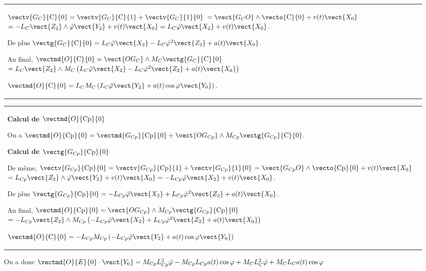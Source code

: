 \begin{multicols}{2}
\begin{corrige}
\begin{tabular}{|p{.9\linewidth}}
$\vectv{G_C}{\text{C}}{0}=\vectv{G_C}{\text{C}}{1}+\vectv{G_C}{\text{1}}{0}$ $=\vect{G_CO}\wedge \vecto{\text{C}}{0}+v(t)\vect{X_0}$ $=-L_C\vect{Z_2}\wedge \dot{\varphi}\vect{Y_2}+v(t)\vect{X_0}=L_C \dot{\varphi}\vect{X_2}+v(t)\vect{X_0}$.

De plus  $\vectg{G_C}{\text{C}}{0}=L_C \ddot{\varphi}\vect{X_2}-L_C \dot{\varphi}^2\vect{Z_2}+a(t)\vect{X_0}$.

Au final, $\vectmd{O}{\text{C}}{0} = \vect{OG_C} \wedge M_C\vectg{G_{C}}{\text{C}}{0}$
$ =L_C\vect{Z_2} \wedge M_C \left( L_C \ddot{\varphi}\vect{X_2}-L_C \dot{\varphi}^2\vect{Z_2}+a(t)\vect{X_0} \right)$

$\vectmd{O}{\text{C}}{0} =L_C M_C \left( L_C \ddot{\varphi}\vect{Y_2} +a(t) \cos \varphi \vect{Y_0} \right)$.

\end{tabular}

\vspace{.25cm}

 \begin{tabular}{|p{.9\linewidth}}
\textbf{Calcul de $\vectmd{O}{\text{Cp}}{0}$}

 On a $\vectmd{O}{\text{Cp}}{0} = \vectmd{G_{Cp}}{\text{Cp}}{0}+\vect{OG_{Cp}} \wedge M_{Cp}\vectg{G_{Cp}}{\text{C}}{0}$.

\textbf{Calcul de $\vectg{G_{Cp}}{\text{Cp}}{0}$}

De même, $\vectv{G_{Cp}}{\text{Cp}}{0}=\vectv{G_{Cp}}{\text{Cp}}{1}+\vectv{G_{Cp}}{\text{1}}{0}$ $=\vect{G_{Cp}O}\wedge \vecto{\text{Cp}}{0}+v(t)\vect{X_0}$ $=L_{Cp}\vect{Z_2}\wedge \dot{\varphi}\vect{Y_2}+v(t)\vect{X_0}=-L_{Cp} \dot{\varphi}\vect{X_2}+v(t)\vect{X_0}$. 

De plus  $\vectg{G_{Cp}}{\text{Cp}}{0}=-L_{Cp} \ddot{\varphi}\vect{X_2}+L_{Cp} \dot{\varphi}^2\vect{Z_2}+a(t)\vect{X_0}$. 

Au final, $\vectmd{O}{\text{Cp}}{0} = \vect{OG_{Cp}} \wedge M_{Cp}\vectg{G_{Cp}}{\text{Cp}}{0}$
$ =-L_{Cp}\vect{Z_2} \wedge M_{Cp} \left( -L_{Cp} \ddot{\varphi}\vect{X_2}+L_{Cp} \dot{\varphi}^2\vect{Z_2}+a(t)\vect{X_0}\right)$

$\vectmd{O}{\text{C}}{0} =-L_{Cp} M_{Cp} \left( -L_{Cp} \ddot{\varphi}\vect{Y_2} +a(t)\cos\varphi\vect{Y_0} \right)$
\\
\end{tabular}

On a donc $\vectmd{O}{E}{0}\cdot \vect{Y_0} =M_{Cp} L_{Cp}^2 \ddot{\varphi} -M_{Cp}L_{Cp}a(t)\cos\varphi +  M_CL_C^2 \ddot{\varphi} +M_CL_Ca(t) \cos \varphi $


\end{corrige}
\end{multicols}
